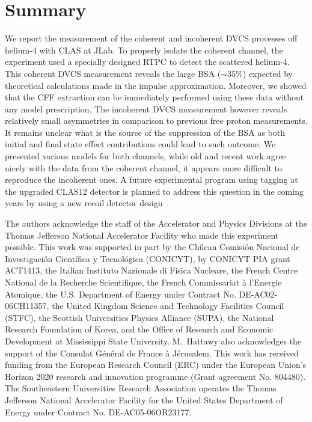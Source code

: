 \documentclass[aps,prc,preprint,superscriptaddress]{revtex4}
\begin{document}
\section{Summary}

We report the measurement of the coherent and incoherent DVCS processes off helium-4 with
CLAS at JLab. To properly isolate the coherent channel, the experiment used a specially 
designed RTPC to detect the scattered helium-4. This coherent 
DVCS measurement reveals the large BSA ($\sim 35$\%) expected by theoretical calculations
made in the impulse approximation. Moreover, we showed that the CFF extraction can be 
immediately performed using these data without any model prescription. The incoherent DVCS measurement 
however reveals relatively small asymmetries in comparison to previous free proton 
measurements. It remains unclear what is the source of the suppression of the BSA as both 
initial and final state effect contributions could lead to such outcome. We presented 
various models for both channels, while old and recent work agree nicely with the data
from the coherent channel, it appears more difficult to reproduce the incoherent ones.
A future experimental program using tagging at the upgraded CLAS12 detector is 
planned to address this question in the coming years by using a new recoil detector 
design~\cite{Armstrong:2017zcm}.

\begin{acknowledgments}
The authors acknowledge the staff of the Accelerator and Physics Divisions at 
the Thomas Jefferson National Accelerator Facility who made this experiment 
possible. This work was supported in part by the Chilean Comisi\'on Nacional de 
Investigaci\'on Cient\'ifica y Tecnol\'ogica (CONICYT), by CONICYT PIA grant 
ACT1413, the Italian Instituto Nazionale di Fisica Nucleare, the French Centre 
National de la Recherche Scientifique, the French Commissariat \`a l'Energie 
Atomique, the U.S. Department of Energy under Contract No. DE-AC02-06CH11357, 
the United Kingdom Science and Technology Facilities Council (STFC), the 
Scottish Universities Physics Alliance (SUPA), the National Research Foundation 
of Korea, and the Office of Research and Economic Development at Mississippi 
State University. M.~Hattawy also acknowledges the support of the Consulat 
G\'en\'eral de France \`a J\'erusalem. This work has received funding from 
the European Research Council (ERC) under the European Union’s Horizon 2020 
research and innovation programme (Grant agreement No. 804480). The Southeastern Universities Research 
Association operates the Thomas Jefferson National Accelerator Facility for the 
United States Department of Energy under Contract No. DE-AC05-06OR23177.
\end{acknowledgments}
\end{document}
